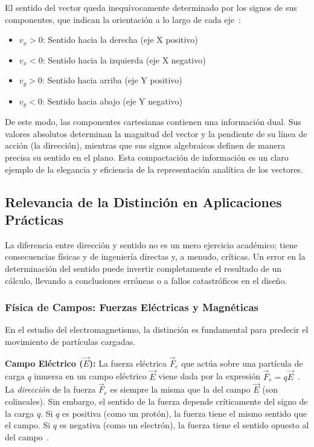 \documentclass[12pt,a4paper]{article}
\begin{document}
El sentido del vector queda inequívocamente determinado por los signos de sus componentes, que indican la orientación a lo largo de cada eje~\cite{openstax_fisica}:

\begin{itemize}
\item $v_x > 0$: Sentido hacia la derecha (eje X positivo)
\item $v_x < 0$: Sentido hacia la izquierda (eje X negativo)
\item $v_y > 0$: Sentido hacia arriba (eje Y positivo)  
\item $v_y < 0$: Sentido hacia abajo (eje Y negativo)
\end{itemize}

De este modo, las componentes cartesianas contienen una información dual. Sus valores absolutos determinan la magnitud del vector y la pendiente de su línea de acción (la dirección), mientras que sus signos algebraicos definen de manera precisa su sentido en el plano. Esta compactación de información es un claro ejemplo de la elegancia y eficiencia de la representación analítica de los vectores.

\subsection{Relevancia de la Distinción en Aplicaciones Prácticas} \label{subsec:aplicaciones}

La diferencia entre dirección y sentido no es un mero ejercicio académico; tiene consecuencias físicas y de ingeniería directas y, a menudo, críticas. Un error en la determinación del sentido puede invertir completamente el resultado de un cálculo, llevando a conclusiones erróneas o a fallos catastróficos en el diseño.

\subsubsection{Física de Campos: Fuerzas Eléctricas y Magnéticas} \label{subsubsec:campos}

En el estudio del electromagnetismo, la distinción es fundamental para predecir el movimiento de partículas cargadas.

\textbf{Campo Eléctrico ($\vec{E}$):} La fuerza eléctrica $\vec{F}_e$ que actúa sobre una partícula de carga $q$ inmersa en un campo eléctrico $\vec{E}$ viene dada por la expresión $\vec{F}_e = q\vec{E}$~\cite{serway2008}. La \emph{dirección} de la fuerza $\vec{F}_e$ es siempre la misma que la del campo $\vec{E}$ (son colineales). Sin embargo, el sentido de la fuerza depende críticamente del signo de la carga $q$. Si $q$ es positiva (como un protón), la fuerza tiene el mismo sentido que el campo. Si $q$ es negativa (como un electrón), la fuerza tiene el sentido opuesto al del campo~\cite{bariloche_web}.
\end{document}
